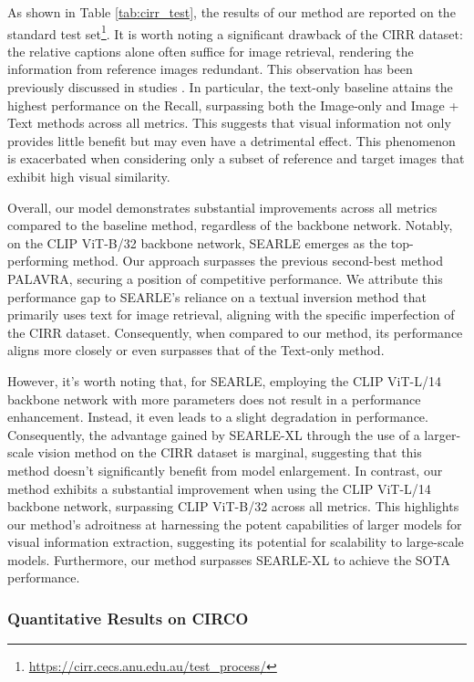 \documentclass[10pt,twocolumn,letterpaper]{article}
\begin{document}
As shown in Table \ref{tab:cirr_test}, the results of our method are reported on the standard test set\footnote{\url{https://cirr.cecs.anu.edu.au/test_process/}}. It is worth noting a significant drawback of the CIRR dataset: the relative captions alone often suffice for image retrieval, rendering the information from reference images redundant. This observation has been previously discussed in studies \cite{saito2023pic2word, Baldrati_2023_ICCV}. In particular, the text-only baseline attains the highest performance on the Recall, surpassing both the Image-only and Image + Text methods across all metrics. This suggests that visual information not only provides little benefit but may even have a detrimental effect. This phenomenon is exacerbated when considering only a subset of reference and target images that exhibit high visual similarity.

Overall, our model demonstrates substantial improvements across all metrics compared to the baseline method, regardless of the backbone network. Notably, on the CLIP ViT-B/32 backbone network, SEARLE emerges as the top-performing method. Our approach surpasses the previous second-best method PALAVRA, securing a position of competitive performance. We attribute this performance gap to SEARLE's reliance on a textual inversion method that primarily uses text for image retrieval, aligning with the specific imperfection of the CIRR dataset. Consequently, when compared to our method, its performance aligns more closely or even surpasses that of the Text-only method. 

However, it's worth noting that, for SEARLE, employing the CLIP ViT-L/14 backbone network with more parameters does not result in a performance enhancement. Instead, it even leads to a slight degradation in performance. Consequently, the advantage gained by SEARLE-XL through the use of a larger-scale vision method on the CIRR dataset is marginal, suggesting that this method doesn't significantly benefit from model enlargement. In contrast, our method exhibits a substantial improvement when using the CLIP ViT-L/14 backbone network, surpassing CLIP ViT-B/32 across all metrics. This highlights our method's adroitness at harnessing the potent capabilities of larger models for visual information extraction, suggesting its potential for scalability to large-scale models. Furthermore, our method surpasses SEARLE-XL to achieve the SOTA performance. 



\subsubsection{Quantitative Results on CIRCO}
\end{document}
